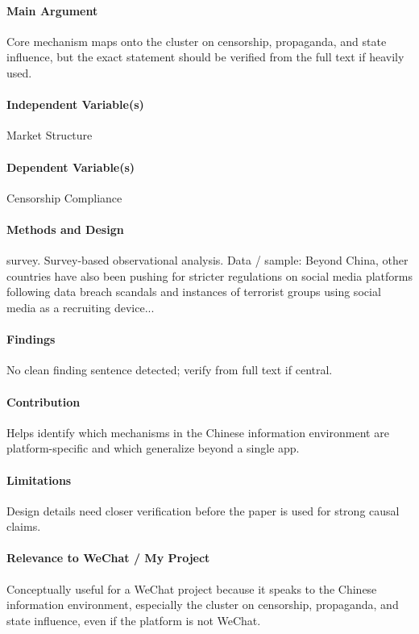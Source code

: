 \documentclass[12pt]{article}
\begin{document}
\paragraph{Main Argument} Core mechanism maps onto the cluster on censorship, propaganda, and state influence, but the exact statement should be verified from the full text if heavily used.

\paragraph{Independent Variable(s)} Market Structure

\paragraph{Dependent Variable(s)} Censorship Compliance

\paragraph{Methods and Design} survey. Survey-based observational analysis. Data / sample: Beyond China, other countries have also been pushing for stricter regulations on social media platforms following data breach scandals and instances of terrorist groups using social media as a recruiting device...

\paragraph{Findings} No clean finding sentence detected; verify from full text if central.

\paragraph{Contribution} Helps identify which mechanisms in the Chinese information environment are platform-specific and which generalize beyond a single app.

\paragraph{Limitations} Design details need closer verification before the paper is used for strong causal claims.

\paragraph{Relevance to WeChat / My Project} Conceptually useful for a WeChat project because it speaks to the Chinese information environment, especially the cluster on censorship, propaganda, and state influence, even if the platform is not WeChat.
\end{document}
